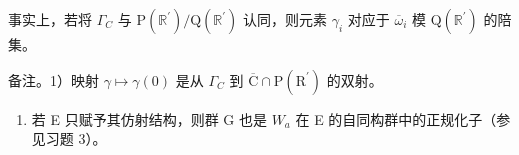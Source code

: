 事实上，若将 \(\Gamma_{C}\) 与 \(\mathrm{P}(\mathbb{R}^{\prime}) / \mathrm{Q}(\mathbb{R}^{\prime})\) 认同，则元素 \(\gamma_{i}\) 对应于 \(\overline{\omega}_{i}\) 模 \(\mathrm{Q}(\mathbb{R}^{\prime})\) 的陪集。

备注。1）映射 \(\gamma \mapsto \gamma(0)\) 是从 \(\Gamma_{C}\) 到 \(\overline{\mathrm{C}} \cap \mathrm{P}(\mathrm{R}^{\prime})\) 的双射。

\begin{enumerate}
\def\labelenumi{\arabic{enumi})}
\setcounter{enumi}{1}
\tightlist
\item
  若 E 只赋予其仿射结构，则群 G 也是 \(W_{a}\) 在 E 的自同构群中的正规化子（参见习题 3）。
\end{enumerate}


